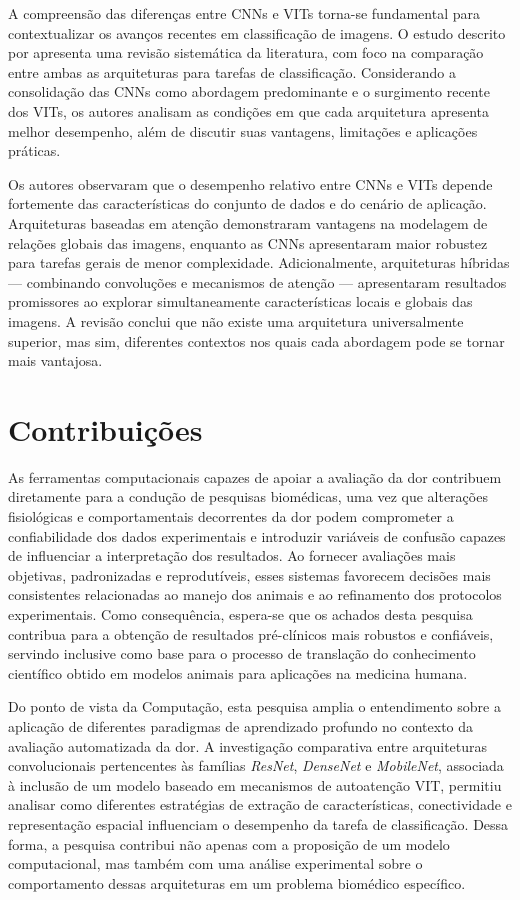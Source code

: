 A compreensão das diferenças entre \acsp{CNN} e \acsp{VIT} torna-se fundamental para contextualizar os avanços recentes em classificação de imagens. O estudo descrito por \cite{mauricio2023} apresenta uma revisão sistemática da literatura, com foco na comparação entre ambas as arquiteturas para tarefas de classificação. Considerando a consolidação das \acsp{CNN} como abordagem predominante e o surgimento recente dos \acsp{VIT}, os autores analisam as condições em que cada arquitetura apresenta melhor desempenho, além de discutir suas vantagens, limitações e aplicações práticas.

Os autores observaram que o desempenho relativo entre \acsp{CNN} e \acsp{VIT} depende fortemente das características do conjunto de dados e do cenário de aplicação. Arquiteturas baseadas em atenção demonstraram vantagens na modelagem de relações globais das imagens, enquanto as \acsp{CNN} apresentaram maior robustez para tarefas gerais de menor complexidade. Adicionalmente, arquiteturas híbridas — combinando convoluções e mecanismos de atenção — apresentaram resultados promissores ao explorar simultaneamente características locais e globais das imagens. A revisão conclui que não existe uma arquitetura universalmente superior, mas sim, diferentes contextos nos quais cada abordagem pode se tornar mais vantajosa.

\section{Contribuições}

As ferramentas computacionais capazes de apoiar a avaliação da dor contribuem diretamente para a condução de pesquisas biomédicas, uma vez que alterações fisiológicas e comportamentais decorrentes da dor podem comprometer a confiabilidade dos dados experimentais e introduzir variáveis de confusão capazes de influenciar a interpretação dos resultados. Ao fornecer avaliações mais objetivas, padronizadas e reprodutíveis, esses sistemas favorecem decisões mais consistentes relacionadas ao manejo dos animais e ao refinamento dos protocolos experimentais. Como consequência, espera-se que os achados desta pesquisa contribua para a obtenção de resultados pré-clínicos mais robustos e confiáveis, servindo inclusive como base para o processo de translação do conhecimento científico obtido em modelos animais para aplicações na medicina humana.

Do ponto de vista da Computação, esta pesquisa amplia o entendimento sobre a aplicação de diferentes paradigmas de aprendizado profundo no contexto da avaliação automatizada da dor. A investigação comparativa entre arquiteturas convolucionais pertencentes às famílias \textit{ResNet}, \textit{DenseNet} e \textit{MobileNet}, associada à inclusão de um modelo baseado em mecanismos de autoatenção \acs{VIT}, permitiu analisar como diferentes estratégias de extração de características, conectividade e representação espacial influenciam o desempenho da tarefa de classificação. Dessa forma, a pesquisa contribui não apenas com a proposição de um modelo computacional, mas também com uma análise experimental sobre o comportamento dessas arquiteturas em um problema biomédico específico.

